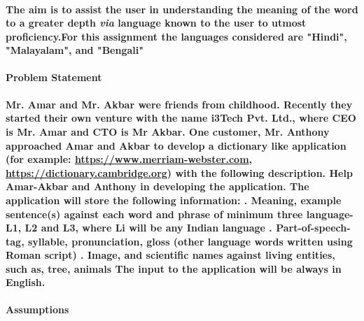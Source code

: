 \documentclass{article}
\begin{document}
\paragraph{
The aim is to assist the user in understanding the meaning of the word to a greater depth \textit{via} language known to the user to utmost proficiency.For this assignment the languages considered are \textbf{"Hindi", "Malayalam", and "Bengali" } \newline\newline\newline
}

\huge{\textbf{Problem Statement}} \newline
\hline
\paragraph{
Mr. Amar and Mr. Akbar were friends from childhood. Recently they started their own venture with the
name i3Tech Pvt. Ltd., where CEO is Mr. Amar and CTO is Mr Akbar. One customer, Mr.
Anthony approached Amar and Akbar to develop a dictionary like application (for example:
\href{https://www.merriam-webster.com/}{https://www.merriam-webster.com}, \href{https://dictionary.cambridge.org/}{https://dictionary.cambridge.org}) with the following description.
Help Amar-Akbar and Anthony in developing the application. The application will store the
following information: . Meaning, example sentence(s) against each word and phrase of minimum three language- L1, L2 and L3, where Li will be any Indian language . Part-of-speech-tag, syllable, pronunciation, gloss (other language words written using Roman script) . Image, and scientific names against living entities, such as, tree, animals\newline
The input to the application will be always in English.\newline\newline\newline
}

\huge{\textbf{Assumptions}}\newline
\hline
\end{document}
